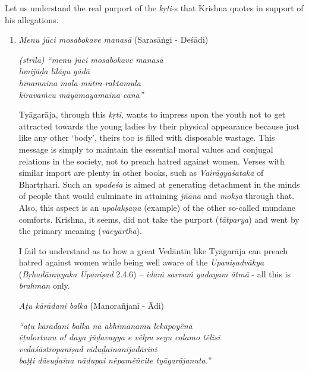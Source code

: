 Let us understand the real purport of the \textit{kṛti}-s that Krishna quotes in support of his allegations.

\begin{enumerate}
\itemsep=0pt

 \item 
 \textit{Menu jūci mosabokave manasā} (Sarasāṅgi - Deśādi)

\begin{longquote}
\textit{(strīla) “menu jūci mosabokave manasā}\\ \textit{lonijāḍa līlāgu gādā}\\ \textit{hīnamaina mala-mūtra-raktamula}\\ \textit{kiravaṁcu māyāmayamaina cāna”}
\end{longquote}

 Tyāgarāja, through this \textit{kṛti,} wants to impress upon the youth not to get attracted towards the young ladies by their physical appearance because just like any other ‘body’, theirs too is filled with disposable wastage. This message is simply to maintain the essential moral values and conjugal relations in the society, not to preach hatred against women. Verses with similar import are plenty in other books, such as \textit{Vairāgyaśataka} of Bhartṛhari. Such an \textit{upadeśa} is aimed at generating detachment in the minds of people that would culminate in attaining \textit{jñāna} and \textit{mokṣa} through that. Also, this aspect is an \textit{upalakṣaṇa} (example) of the other so-called mundane comforts. Krishna, it seems, did not take the purport (\textit{tātparya}) and went by the primary meaning (\textit{vācyārtha}).

 I fail to understand as to how a great Vedāntīn like Tyāgarāja can preach hatred against women while being well aware of the \textit{Upaniṣadvākya} (\textit{Bṛhadāraṇyaka Upaniṣad} 2.4.6) – \textit{idaṁ sarvaṁ yadayam ātmā} - all this is \textit{brahman} only.

 \textit{Aṭu kārādani balka} (Manorañjanī - Ādi)

\begin{longquote}
\textit{“aṭu kārādani balka nā abhimānamu lekapoyênā} \\ \textit{êṭulortunu o! daya jūḍavayya e vêlpu seyu calamo têlisi}\\ \textit{vedaśāstropaniṣad viduḍainanijadārini} \\ \textit{baṭṭi dāsuḍaina nādupai nêpamêñcite tyāgarājanuta.}”
\end{longquote}


\end{enumerate}

